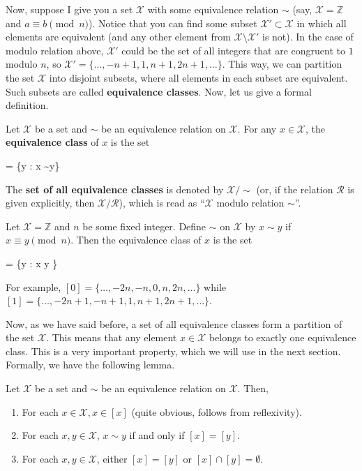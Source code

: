 \documentclass[../lecture-notes-148x210.tex]{subfiles}
\begin{document}
Now, suppose I give you a set $\mathcal{X}$ with some equivalence relation $\sim$ (say, $\mathcal{X} = \mathbb{Z}$ and $a \equiv b \pmod{n}$). Notice that you can find some subset $\mathcal{X}' \subset \mathcal{X}$ in which all elements are equivalent (and any other element from $\mathcal{X} \setminus \mathcal{X}'$ is not). In the case of modulo relation above, $\mathcal{X}'$ could be the set of all integers that are congruent to $1$ modulo $n$, so $\mathcal{X}' = \{\dots,-n+1,1,n+1,2n+1,\dots\}$. This way, we can partition the set $\mathcal{X}$ into disjoint subsets, where all elements in each subset are equivalent. Such subsets are called \textbf{equivalence classes}. Now, let us give a formal definition.

\begin{definition}
    Let $\mathcal{X}$ be a set and $\sim$ be an equivalence relation on $\mathcal{X}$. For any $x \in \mathcal{X}$, the \textbf{equivalence class} of $x$ is the set
    \begin{xequation*}
        [x] = \{y \in {}: x \sim y\}
    \end{xequation*}
    The \textbf{set of all equivalence classes} is denoted by $\mathcal{X}/\text{$\sim$}$ (or, if the relation $\mathcal{R}$ is given explicitly, then $\mathcal{X}/\mathcal{R}$), which is read as ``$\mathcal{X}$ modulo relation $\sim$''.
\end{definition}

\begin{example}
    Let $\mathcal{X} = \mathbb{Z}$ and $n$ be some fixed integer. Define $\sim$ on $\mathcal{X}$ by $x \sim y$ if $x \equiv y \pmod{n}$. Then the equivalence class of $x$ is the set
    \begin{xequation*}
        [x] = \{y \in {}: x \equiv y \}
    \end{xequation*}
    For example, $[0] = \{\ldots,-2n,-n,0,n,2n,\ldots\}$ while $[1] = \{\ldots,-2n+1,-n+1,1,n+1,2n+1,\ldots\}$.
\end{example}

Now, as we have said before, a set of all equivalence classes form a partition of the set $\mathcal{X}$. This means that any element $x \in \mathcal{X}$ belongs to exactly one equivalence class. This is a very important property, which we will use in the next section. Formally, we have the following lemma.
\begin{lemma}
    Let $\mathcal{X}$ be a set and $\sim$ be an equivalence relation on $\mathcal{X}$. Then,
    \begin{enumerate}
        \item For each $x \in \mathcal{X}, x \in [x]$ (quite obvious, follows from reflexivity).
        \item For each $x,y \in \mathcal{X}$, $x \sim y$ if and only if $[x] = [y]$.
        \item For each $x,y \in \mathcal{X}$, either $[x]=[y]$ or $[x] \cap [y] = \emptyset$.
    \end{enumerate}
\end{lemma}
\end{document}
